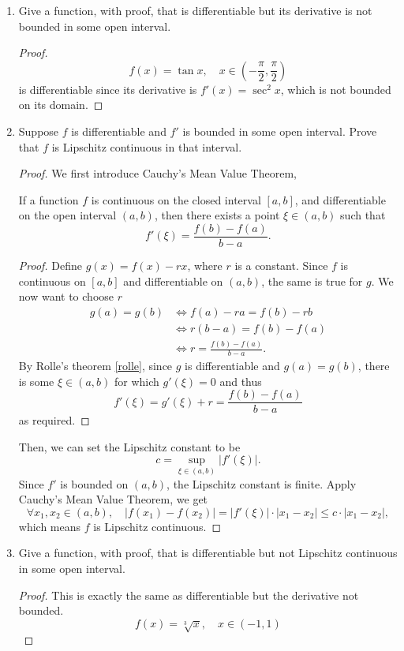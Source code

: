 \begin{enumerate}
	\item Give a function, with proof, that is differentiable but its derivative is not bounded in some open interval.
	\begin{proof}
	\[ f(x)=\tan x, \quad x\in\left(-\frac{\pi}{2},\frac{\pi}{2}\right) \]
	is differentiable since its derivative is \(f'(x)=\sec^2x\), which is not bounded on its domain.
	\end{proof}
	\item Suppose $f$ is differentiable and $f'$ is bounded in some open interval.
	Prove that $f$ is Lipschitz continuous in that interval.
	\begin{proof}
	We first introduce Cauchy's Mean Value Theorem,
	\begin{theorem}
	\label{cauchymean}
	If a function $f$ is continuous on the closed interval \([a,b]\), and differentiable on the open interval \((a,b)\), then there exists a point \(\xi\in(a,b)\) such that
	\[ f'(\xi)=\frac{f(b)-f(a)}{b-a}. \]
	\end{theorem}
	\begin{proof}
	Define \(g(x)=f(x)-rx\), where $r$ is a constant.
	Since $f$ is continuous on \([a,b]\) and {}differentiable on \((a,b)\), the same is true for $g$.
	We now want to choose $r$
	\begin{align*}
	g(a)=g(b)&\iff f(a)-ra=f(b)-rb\\
	&\iff r(b-a)=f(b)-f(a) \\
	&\iff r=\frac{f(b)-f(a)}{b-a}.
	\end{align*}
	By Rolle's theorem \ref{rolle}, since $g$ is differentiable and \(g(a)=g(b)\), there is some \(\xi\in(a,b)\) for which \(g'(\xi)=0\) and thus 
	\[ f'(\xi)=g'(\xi)+r=\frac{f(b)-f(a)}{b-a}\]
	as required.
	\end{proof}
	Then, we can set the Lipschitz constant to be
	\[ c=\sup_{\xi\in(a,b)}|f'(\xi)|. \]
	Since $f'$ is bounded on \((a,b)\), the Lipschitz constant is finite.
	Apply Cauchy's Mean Value Theorem, we get
	\[ \forall x_1,x_2\in(a,b),\quad |f(x_1)-f(x_2)|=|f'(\xi)|\cdot|x_1-x_2|\leq c\cdot|x_1-x_2|, \]
	which means $f$ is Lipschitz continuous.
	\end{proof}
	\item Give a function, with proof, that is differentiable but not Lipschitz continuous in some open interval.
	\begin{proof}
	This is exactly the same as differentiable but the derivative not bounded.	
	\[ f(x)=\sqrt[3]{x}, \quad x\in(-1,1) \]

\end{proof}
\end{enumerate}
